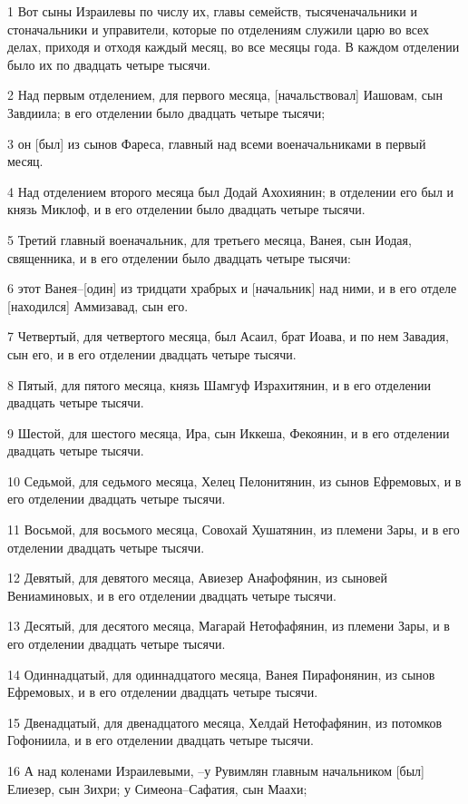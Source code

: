 \par 1 Вот сыны Израилевы по числу их, главы семейств, тысяченачальники и стоначальники и управители, которые по отделениям служили царю во всех делах, приходя и отходя каждый месяц, во все месяцы года. В каждом отделении было их по двадцать четыре тысячи.
\par 2 Над первым отделением, для первого месяца, [начальствовал] Иашовам, сын Завдиила; в его отделении было двадцать четыре тысячи;
\par 3 он [был] из сынов Фареса, главный над всеми военачальниками в первый месяц.
\par 4 Над отделением второго месяца был Додай Ахохиянин; в отделении его был и князь Миклоф, и в его отделении было двадцать четыре тысячи.
\par 5 Третий главный военачальник, для третьего месяца, Ванея, сын Иодая, священника, и в его отделении было двадцать четыре тысячи:
\par 6 этот Ванея--[один] из тридцати храбрых и [начальник] над ними, и в его отделе [находился] Аммизавад, сын его.
\par 7 Четвертый, для четвертого месяца, был Асаил, брат Иоава, и по нем Завадия, сын его, и в его отделении двадцать четыре тысячи.
\par 8 Пятый, для пятого месяца, князь Шамгуф Израхитянин, и в его отделении двадцать четыре тысячи.
\par 9 Шестой, для шестого месяца, Ира, сын Иккеша, Фекоянин, и в его отделении двадцать четыре тысячи.
\par 10 Седьмой, для седьмого месяца, Хелец Пелонитянин, из сынов Ефремовых, и в его отделении двадцать четыре тысячи.
\par 11 Восьмой, для восьмого месяца, Совохай Хушатянин, из племени Зары, и в его отделении двадцать четыре тысячи.
\par 12 Девятый, для девятого месяца, Авиезер Анафофянин, из сыновей Вениаминовых, и в его отделении двадцать четыре тысячи.
\par 13 Десятый, для десятого месяца, Магарай Нетофафянин, из племени Зары, и в его отделении двадцать четыре тысячи.
\par 14 Одиннадцатый, для одиннадцатого месяца, Ванея Пирафонянин, из сынов Ефремовых, и в его отделении двадцать четыре тысячи.
\par 15 Двенадцатый, для двенадцатого месяца, Хелдай Нетофафянин, из потомков Гофониила, и в его отделении двадцать четыре тысячи.
\par 16 А над коленами Израилевыми, --у Рувимлян главным начальником [был] Елиезер, сын Зихри; у Симеона--Сафатия, сын Маахи;
